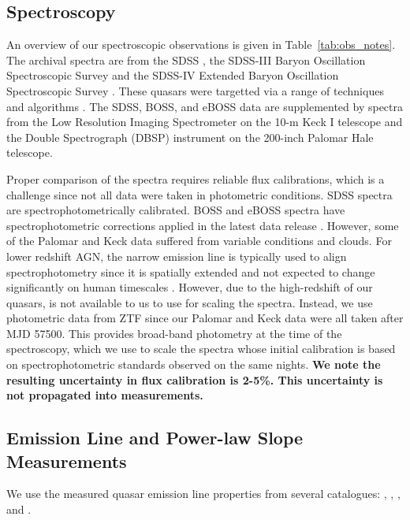 \documentclass[fleqn,usenatbib]{mnras}
\begin{document}


\subsection{Spectroscopy}
An overview of our spectroscopic observations is given in
Table~\ref{tab:obs_notes}.  The archival spectra are from the SDSS
\citep{Stoughton2002, DR7, Schneider2010}, the SDSS-III Baryon
Oscillation Spectroscopic Survey \citep[BOSS; ][]{Eisenstein2011,
Dawson2013, Smee2013, Alam2015, Paris2017} and the SDSS-IV Extended
Baryon Oscillation Spectroscopic Survey \citep[eBOSS; ][]{Dawson2016,
Abolfathi2018, Paris2018}.  These quasars were targetted via a range
of techniques and algorithms \citep[see][]{Richards2002, Ross2012,
Myers2015}. The SDSS, BOSS, and eBOSS data are supplemented by spectra
from the Low Resolution Imaging Spectrometer \citep[LRIS; ][]{Oke1995}
on the 10-m Keck {\sc I} telescope and the Double Spectrograph (DBSP)
instrument on the 200-inch Palomar Hale telescope.

Proper comparison of the spectra requires reliable flux calibrations,
which is a challenge since not all data were taken in photometric
conditions.  SDSS spectra are spectrophotometrically calibrated.  BOSS
and eBOSS spectra have spectrophotometric corrections applied in the
latest data release \citep{Hutchinson2016, Jensen2016, Margala2016}.
However, some of the Palomar and Keck data suffered from variable
conditions and clouds.  For lower redshift AGN, the narrow \oiii
emission line is typically used to align spectrophotometry since it is
spatially extended and not expected to change significantly on human
timescales \citep[e.g.,][]{Barth2011}. However, due to the
high-redshift of our quasars, \oiii is not available to us to use for
scaling the spectra.  Instead, we use photometric data from ZTF since
our Palomar and Keck data were all taken after MJD 57500.  This
provides broad-band photometry at the time of the spectroscopy, which
we use to scale the spectra whose initial calibration is based on
spectrophotometric standards observed on the same nights.
{\bf We note the resulting uncertainty in flux calibration is 2-5\%.
  This uncertainty is not propagated into measurements. 
}


\subsection{Emission Line and Power-law Slope Measurements}
We use the measured quasar emission line properties from several catalogues: 
\citet{Shen2011}, \citet{Hamann2017}, \citet{Kozlowski2017}, and
\citet{Calderone2017}.
\end{document}
